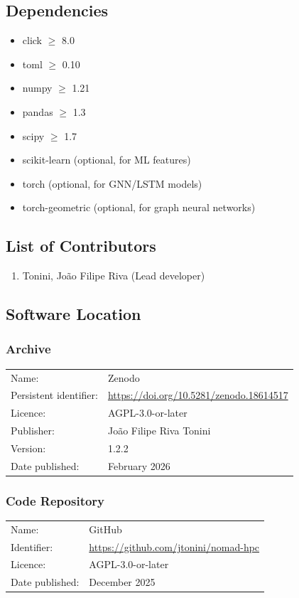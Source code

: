 \documentclass[11pt,a4paper]{article}
\begin{document}
\subsection*{Dependencies}
\begin{itemize}
\item click $\geq$ 8.0
\item toml $\geq$ 0.10
\item numpy $\geq$ 1.21
\item pandas $\geq$ 1.3
\item scipy $\geq$ 1.7
\item scikit-learn \cite{sklearn} (optional, for ML features)
\item torch (optional, for GNN/LSTM models)
\item torch-geometric (optional, for graph neural networks)
\end{itemize}

\subsection*{List of Contributors}
\begin{enumerate}
\item Tonini, João Filipe Riva (Lead developer)
\end{enumerate}

\subsection*{Software Location}

\subsubsection*{Archive}
\begin{tabular}{ll}
Name: & Zenodo \\
Persistent identifier: & \url{https://doi.org/10.5281/zenodo.18614517} \\
Licence: & AGPL-3.0-or-later \\
Publisher: & João Filipe Riva Tonini \\
Version: & 1.2.2 \\
Date published: & February 2026 \\
\end{tabular}

\subsubsection*{Code Repository}
\begin{tabular}{ll}
Name: & GitHub \\
Identifier: & \url{https://github.com/jtonini/nomad-hpc} \\
Licence: & AGPL-3.0-or-later \\
Date published: & December 2025 \\
\end{tabular}
\end{document}
